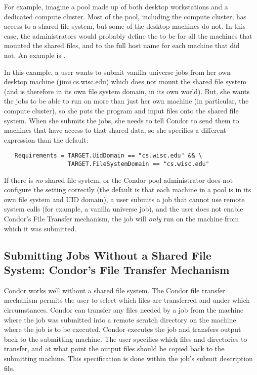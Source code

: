 For example, imagine a pool made up of both desktop workstations and a
dedicated compute cluster.
Most of the pool, including the compute cluster, has access to a
shared file system, but some of the desktop machines do not.
In this case, the administrators would probably define the
 to be  for all the machines
that mounted the shared files, and to the full host name for each
machine that did not. An example is .

In this example,
a user wants to submit vanilla universe jobs from her own desktop
machine (jimi.cs.wisc.edu) which does not mount the shared file system
(and is therefore in its own file system domain, in its own world).
But, she wants the jobs to be able to run on more than just her own
machine (in particular, the compute cluster), so she puts the program
and input files onto the shared file system.
When she submits the jobs, she needs to tell Condor to send them to
machines that have access to that shared data, so she specifies a
different  expression than the default:
\begin{verbatim}
   Requirements = TARGET.UidDomain == "cs.wisc.edu" && \
                  TARGET.FileSystemDomain == "cs.wisc.edu"
\end{verbatim}

\Warn If there is \emph{no} shared file system, or the Condor pool
administrator does not configure the \AdAttr{FileSystemDomain}
setting correctly (the default is that each machine in a pool is in
its own file system and UID domain), a user submits a job that cannot
use remote system calls (for example, a vanilla universe job), and the
user does not enable Condor's File Transfer mechanism, the job will
\emph{only} run on the machine from which it was submitted.


\subsection{\label{sec:file-transfer}
Submitting Jobs Without a Shared File System:
Condor's File Transfer Mechanism} 


Condor works well without a shared file system.
The Condor file transfer mechanism permits the user to select which files are
transferred and under which circumstances.
Condor can transfer any files needed by a job from
the machine where the job was submitted into a
remote scratch directory on the machine where the
job is to be executed.
Condor executes the job
and transfers output back to the submitting machine.
The user specifies which files and directories to transfer,
and at what point the output files should be copied back to the
submitting machine.
This specification is done within the job's submit description file.

